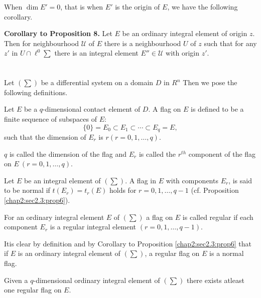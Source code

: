 When $\dim E' = 0$,  that is when $E'$ is the origin of $E$,  we have
the following corollary. 

\noindent
\textbf{Corollary to Proposition 8.} Let $E$ be an ordinary integral
element of origin $z$. Then for neighbourhood $\mathscr{U}$ of $E$
there is a neighbourhood $U $ of $z$ such that for any $z'$ in $U \cap
\ell^0 \sum$ there is an integral element $E'' \in \mathscr{U}$ with
origin $z'$. 

\section{}\label{chap2:sec2.5} 

Let $(\sum)$ be a differential system on a domain $D$ in $R^n$ Then we
pose the following definitions. 

\begin{defi*} %
  Let $E$ be a $q$-dimensional contact element of $D$. A flag on $E$ is
  defined to be a finite sequence of subspaces of $E$: 
  $$
  \{ 0 \} = E_0 \subset E_1 \subset \cdots \subset E_q = E, 
  $$
  such that the dimension of $E_r$ is $r (r = 0,  1,  \ldots ,  q)$.
\end{defi*}

$q$ is called the dimension of the flag and $E_r$ is called the
$r^{th}$ component of the flag on $E ~ (r = 0,  1,  \ldots ,  q)$. 

\begin{defi*} %
  Let $E$ be an integral element of $(\sum)$. A flag in $E$ with
  components $E_r$,  is said to be normal if $t(E_r) = t_r (E)$ holds
  for $r= 0,  1,  \ldots ,  q-1$ (cf. Proposition \ref{chap2:sec2.3:prop6}). 
\end{defi*}

\begin{defi*} %
  For an ordinary integral element $E$ of $(\sum)$ a flag on $E$ is
  called regular if each component $E_r$ is a regular integral element
  $(r = 0,  1,  \ldots ,  q-1)$. 
\end{defi*}

It\pageoriginale is clear by definition and by Corollary to Proposition
\ref{chap2:sec2.3:prop6} that if
$E$ is an ordinary integral element of $(\sum)$,  a regular flag on
$E$ is a normal flag. 

\begin{proposition}\label{chap2:sec2.5:prop9}  %
  Given a $q$-dimensional ordinary integral element of $(\sum)$ there
  exists atleast one regular flag on $E$. 
\end{proposition}

